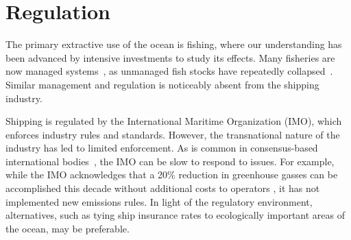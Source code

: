 \section{Regulation}

The primary extractive use of the ocean is fishing, where our understanding has been advanced by intensive investments to study its effects. %
Many fisheries are now managed systems~\citep{worm2009rebuilding}, as unmanaged fish stocks have repeatedly collapsed~\citep{costello2012status}. %
Similar management and regulation is noticeably absent from the shipping industry.
  
Shipping is regulated by the International Maritime Organization (IMO), which enforces industry rules and standards. However, the transnational nature of the industry has led to limited enforcement. As is common in consensus-based international bodies~\citep{cogan2009representation}, the IMO can be slow to respond to issues.
  For example, while the IMO acknowledges that a 20\% reduction in greenhouse gasses can be accomplished this decade without additional costs to operators \citep{imo2009}, it has not implemented new emissions rules.  In light of the regulatory environment, alternatives, such as tying ship insurance rates to ecologically important areas of the ocean, may be preferable.


